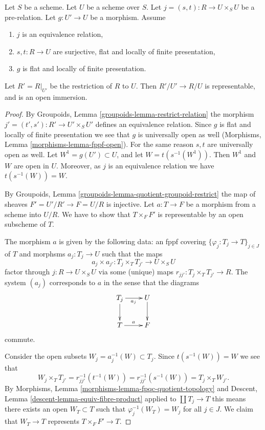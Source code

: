 \begin{lemma}
\label{lemma-finding-opens}
Let $S$ be a scheme.
Let $U$ be a scheme over $S$.
Let $j = (s, t) : R \to U \times_S U$ be a pre-relation.
Let $g : U' \to U$ be a morphism.
Assume
\begin{enumerate}
\item $j$ is an equivalence relation,
\item $s, t : R \to U$ are surjective, flat and
locally of finite presentation,
\item $g$ is flat and locally of finite presentation.
\end{enumerate}
Let $R' = R|_{U'}$ be the restriction of $R$ to $U$. Then
$R'/U' \to R/U$ is representable, and is an open immersion.
\end{lemma}

\begin{proof}
By Groupoids, Lemma \ref{groupoids-lemma-restrict-relation}
the morphism $j' = (t', s') : R' \to U' \times_S U'$
defines an equivalence relation. Since $g$ is flat and locally of
finite presentation we see that $g$ is universally open as well
(Morphisms, Lemma \ref{morphisms-lemma-fppf-open}).
For the same reason $s, t$ are universally open as well.
Let $W^1 = g(U') \subset U$, and let $W = t(s^{-1}(W^1))$.
Then $W^1$ and $W$ are open in $U$. Moreover, as $j$ is an
equivalence relation we have $t(s^{-1}(W)) = W$.

\medskip\noindent
By Groupoids, Lemma \ref{groupoids-lemma-quotient-groupoid-restrict}
the map of sheaves $F' = U'/R' \to F = U/R$ is injective.
Let $a : T \to F$ be a morphism from a scheme into $U/R$.
We have to show that $T \times_F F'$ is representable
by an open subscheme of $T$.

\medskip\noindent
The morphism $a$ is given by the following data:
an fppf covering $\{\varphi_j : T_j \to T\}_{j \in J}$ of $T$ and
morphsms $a_j : T_j \to U$ such that the maps
$$
a_j \times a_{j'} :
T_j \times_T T_{j'}
\longrightarrow
U \times_S U
$$
factor through $j : R \to U \times_S U$ via some (unique) maps
$r_{jj'} : T_j \times_T T_{j'} \to R$. The system
$(a_j)$ corresponds to $a$ in the sense that the diagrams
$$
\xymatrix{
T_j \ar[r]_{a_j} \ar[d] & U \ar[d] \\
T \ar[r]^a & F
}
$$
commute.

\medskip\noindent
Consider the open subsets $W_j = a_j^{-1}(W) \subset T_j$.
Since $t(s^{-1}(W)) = W$ we see that
$$
W_j \times_T T_{j'} =
r_{jj'}^{-1}(t^{-1}(W)) = r_{jj'}^{-1}(s^{-1}(W)) =
T_j \times_T W_{j'}.
$$
By Morphisms, Lemma \ref{morphisms-lemma-fpqc-quotient-topology}
and Descent, Lemma \ref{descent-lemma-equiv-fibre-product}
applied to $\coprod T_j \to T$ this means there exists an open
$W_T \subset T$ such that $\varphi_j^{-1}(W_T) = W_j$ for all $j \in J$.
We claim that $W_T \to T$ represents $T \times_F F' \to T$.


\end{proof}
